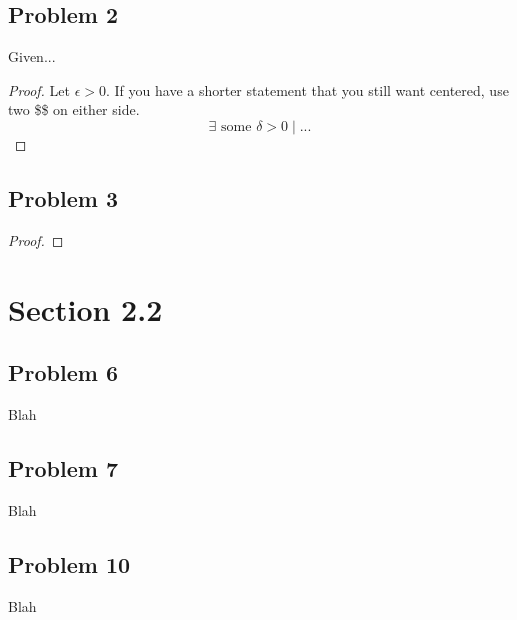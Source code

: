 \documentclass{article}
\begin{document}
\subsection*{Problem 2}
Given...
\begin{proof}
Let $\epsilon>0$.
If you have a shorter statement that you still want centered, use two \$\$ on either side.
$$\exists \textrm{ some } \delta>0 \mid ...$$
\end{proof}

\subsection*{Problem 3}
%
\begin{proof}
%
\end{proof}

\section*{Section 2.2}
%
\subsection*{Problem 6}
Blah
\subsection*{Problem 7}
Blah
\subsection*{Problem 10}
Blah
\end{document}
